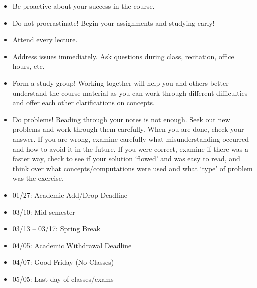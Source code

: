 \documentclass[11pt,letterpaper]{article}
\begin{document}
\begin{itemize} \itemsep=0.3ex
\item Be proactive about your success in the course.
\item Do not procrastinate! Begin your assignments and studying early!
\item Attend every lecture.
\item Address issues immediately. Ask questions during class, recitation, office hours, etc. 
\item Form a study group! Working together will help you and others better understand the course material as you can work through different difficulties and offer each other clarifications on concepts.
\item Do problems! Reading through your notes is not enough. Seek out new problems and work through them carefully. When you are done, check your answer. If you are wrong, examine carefully what misunderstanding occurred and how to avoid it in the future. If you were correct, examine if there was a faster way, check to see if your solution `flowed' and was easy to read, and think over what concepts/computations were used and what `type' of problem was the exercise.
\end{itemize}
\sectionbreak



\newpage



\begin{itemize} \itemsep=0.3ex
\item 01/27: Academic Add/Drop Deadline
\item 03/10: Mid-semester
\item 03/13 -- 03/17: Spring Break
\item 04/05: Academic Withdrawal Deadline
\item 04/07: Good Friday (No Classes)
\item 05/05: Last day of classes/exams
\end{itemize}
\sectionbreak







\end{document}
